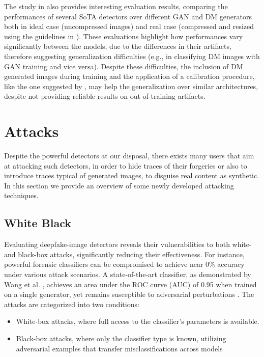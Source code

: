 \documentclass[conference]{IEEEtran} %
\begin{document}
        The study in \cite{corvi2023detection} also provides interesting evaluation results, comparing the performances of several SoTA detectors over different GAN and DM generators both in ideal case (uncompressed images) and real case (compressed and resized using the guidelines in \cite{vipcuplink}). These evaluations highlight how performances vary significantly between the models, due to the differences in their artifacts, therefore suggesting generalization difficulties (e.g., in classifying DM images with GAN training and vice versa). Despite these difficulties, the inclusion of DM generated images during training and the application of a calibration procedure, like the one suggested by \cite{Platt1999probabilistic}, may help the generalization over similar architectures, despite not providing reliable results on out-of-training artifacts.

\section{Attacks}
    Despite the powerful detectors at our disposal, there exists many users that aim at attacking such detectors, in order to hide traces of their forgeries or also to introduce traces typical of generated images, to disguise real content as synthetic. In this section we provide an overview of some newly developed attacking techniques.

    \subsection{White Black}
        Evaluating deepfake-image detectors reveals their vulnerabilities to both white- and black-box attacks, significantly reducing their effectiveness. For instance, powerful forensic classifiers can be compromised to achieve near 0\% accuracy under various attack scenarios. A state-of-the-art classifier, as demonstrated by Wang et al. \cite{Wang_2020_CVPR}, achieves an area under the ROC curve (AUC) of 0.95 when trained on a single generator, yet remains susceptible to adversarial perturbations \cite{mardeenpaper1}.
        The attacks are categorized into two conditions:
        \begin{itemize}
            \item White-box attacks, where full access to the classifier's parameters is available.
            \item Black-box attacks, where only the classifier type is known, utilizing adversarial examples that transfer misclassifications across models
        \end{itemize}
        
\end{document}
